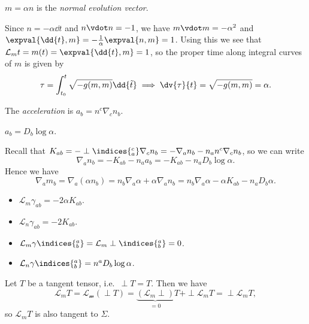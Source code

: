 \documentclass{jknotes}
\begin{document}
\begin{defn}
    \(m=\alpha n\) is the \emph{normal evolution vector}.
\end{defn}
Since \(n=-\alpha\dd{t}\) and \(n\vdot n=-1\), we have \(m\vdot m=-\alpha^2\) and \(\expval{\dd{t},m}=-\frac1\alpha\expval{n,m}=1\). Using this we see that \(\mathcal{L}_m t = m(t) = \expval{\dd{t},m} = 1\), so the proper time along integral curves of \(m\) is given by
\begin{equation}
    \tau = \int^t_{t_0}\sqrt{-g(m,m)}\dd{\tilde{t}} \implies \dv{\tau}{t} = \sqrt{-g(m,m)} = \alpha.
\end{equation}
\begin{defn}
    The \emph{acceleration} is \(a_b = n^c\nabla_cn_b\).
\end{defn}
\begin{lemma}
    \(a_b = D_b\log\alpha\).
\end{lemma}
Recall that \(K_{ab} = -\perp\indices{^c_a}\nabla_c n_b = -\nabla_a n_b - n_an^c\nabla_c n_b\), so we can write
\begin{equation}
    \nabla_an_b = -K_{ab}-n_aa_b = -K_{ab}-n_aD_b\log\alpha.
\end{equation}
Hence we have
\begin{equation}
    \nabla_a m_b = \nabla_a(\alpha n_b) = n_b\nabla_a\alpha + \alpha \nabla_a n_b = n_b\nabla_a\alpha - \alpha K_{ab} - n_a D_b \alpha.
\end{equation}
\begin{lemma}
    \begin{itemize}
        \item \(\mathcal{L}_m\gamma_{ab} = -2\alpha K_{ab}\).
        \item \(\mathcal{L}_n\gamma_{ab} = -2K_{ab}\).
        \item \(\mathcal{L}_m\gamma\indices{^a_b} = \mathcal{L}_m\perp\indices{^a_b} = 0\).
        \item \(\mathcal{L}_n\gamma\indices{^a_b} = n^aD_b\log\alpha\).
    \end{itemize}
\end{lemma}
\begin{cor}
    Let \(T\) be a tangent tensor, i.e.\ \(\perp T = T\). Then we have
    \begin{equation}
        \mathcal{L}_m T = \mathcal{L_m}(\perp T) = \underbrace{(\mathcal{L}_m\perp)}_{=0}T + \perp\mathcal{L}_m T = \perp \mathcal{L}_m T,
    \end{equation}
    so \(\mathcal{L}_m T\) is also tangent to \(\Sigma\).
\end{cor}
\end{document}
